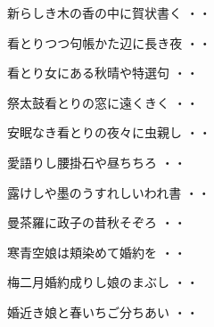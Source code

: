 \begin{shiika}新らしき木の香の中に賀状書く
\hfill{・・}\end{shiika}
\vspace{0.6cm}
\begin{shiika}看とりつつ句帳かた辺に長き夜
\hfill{・・}\end{shiika}
\vspace{0.6cm}
\begin{shiika}看とり女にある秋晴や特選句
\hfill{・・}\end{shiika}
\vspace{0.6cm}
\begin{shiika}祭太鼓看とりの窓に遠くきく
\hfill{・・}\end{shiika}
\vspace{0.6cm}
\begin{shiika}安眠なき看とりの夜々に虫親し
\hfill{・・}\end{shiika}
\vspace{0.6cm}
\begin{shiika}愛語りし腰掛石や昼ちちろ
\hfill{・・}\end{shiika}
\vspace{0.6cm}
\begin{shiika}露けしや墨のうすれしいわれ書
\hfill{・・}\end{shiika}
\vspace{0.6cm}
\begin{shiika}曼茶羅に政子の昔秋そぞろ
\hfill{・・}\end{shiika}
\vspace{0.6cm}
\begin{shiika}寒青空娘は頬染めて婚約を
\hfill{・・}\end{shiika}
\vspace{0.6cm}
\begin{shiika}梅二月婚約成りし娘のまぶし
\hfill{・・}\end{shiika}
\vspace{0.6cm}
\begin{shiika}婚近き娘と春いちご分ちあい
\hfill{・・}\end{shiika}
\vspace{0.6cm}
